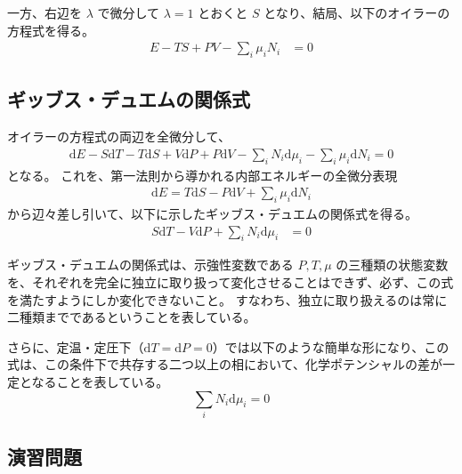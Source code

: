 \documentclass[uplatex,dvipdfmx,a4paper,11pt]{jsarticle}
\newcommand{\diff}{\mathrm d}
\begin{document}
一方、右辺を $\lambda$ で微分して $\lambda = 1$ とおくと $S$ となり、結局、以下のオイラーの方程式を得る。
\begin{align*}
E-TS+PV-\sum_i \mu_i N_i &= 0
\end{align*}

\subsection{ギッブス・デュエムの関係式}
オイラーの方程式の両辺を全微分して、
\begin{align*}
\diff E - S \diff T -T \diff S + V \diff P + P \diff V - \sum_i N_i \diff \mu_i -\sum_i \mu_i \diff N_i = 0
\end{align*}
となる。
これを、第一法則から導かれる内部エネルギーの全微分表現
\begin{align*}
\diff E = T \diff S - P \diff V + \sum_i \mu_i \diff N_i 
\end{align*}
から辺々差し引いて、以下に示したギッブス・デュエムの関係式を得る。
\begin{align*}
S \diff T -V \diff P + \sum_i N_i \diff \mu_i &= 0
\end{align*}

ギッブス・デュエムの関係式は、示強性変数である $P, T, \mu$ の三種類の状態変数を、それぞれを完全に独立に取り扱って変化させることはできず、必ず、この式を満たすようにしか変化できないこと。
すなわち、独立に取り扱えるのは常に二種類までであるということを表している。

さらに、定温・定圧下（$\diff T = \diff P = 0$）では以下のような簡単な形になり、この式は、この条件下で共存する二つ以上の相において、化学ポテンシャルの差が一定となることを表している。
\begin{equation*}
\sum_i N_i \diff \mu_i = 0
\end{equation*}

\subsection{演習問題}
\end{document}
